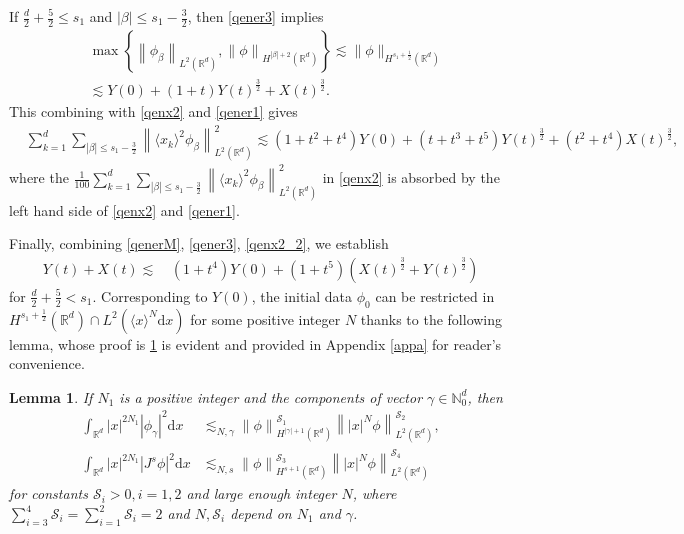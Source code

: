 \documentclass[10pt,twoside,a4paper]{article}
\newtheorem{lem}[thm]{Lemma}
\numberwithin{equation}{section}\allowdisplaybreaks
\def\leq{\leqslant}
\begin{document}
If $ \frac d2+\frac 52\leq s_1 $ and $ |\beta| \leq s_1-\frac32 $,  then  \eqref{qener3} implies
\begin{align}\label{qenbkk}
&	\max \left\{\left\|    \phi_{\beta}\right\|_{L^2(\mathbb{R}^d)}, \left\|   \phi\right\|_{H^{|\beta|+2}(\mathbb{R}^d)}\right\}  	\lesssim	 \|\phi\|_{H^{s_1+\frac 12}(\mathbb{R}^{d})}\nonumber\\
&\lesssim	Y(0)+	 (1+t) Y(t)^{\frac 32} +  X(t)^{\frac 32}.
\end{align}
This combining with \eqref{qenx2} and \eqref{qener1} gives
\begin{align} \label{qenx2_2}
&	\sum_{k=1}^d  \sum_{|\beta| \leq s_1-\frac32}\left\| \langle x_k\rangle^2 \phi_{\beta}\right\|_{L^2(\mathbb{R}^d)} ^2\lesssim  (1+t^2+t^4) Y(0) +(t+t^3+t^5)  Y(t)^{\frac 32} +(t^2+t^4)  X(t)^{\frac 32}, 
\end{align}
where the $  \frac {1}{100} \sum_{k=1}^d \sum_{|\beta| \leq s_1-\frac32}  \left\|  \langle x_k\rangle^2 \phi_{\beta}\right\|_{L^2(\mathbb{R}^d)}^{2}  $ in \eqref{qenx2} is absorbed by the left hand side of  \eqref{qenx2} and \eqref{qener1}.


Finally,  combining \eqref{qenerM}, \eqref{qener3},  \eqref{qenx2_2}, we establish
\begin{align} \label{qener}
		Y(t) +X(t)\lesssim &\, \left(1+ t^4\right)	Y(0)  +	\left(1+ t^5 \right)\left(X(t)^{\frac 32} +Y(t)^{\frac 32}\right)  
	\end{align} 
for $ \frac d2+\frac 52< s_1 .  $    
 Corresponding to $ Y(0) $,   the initial data $ \phi_0 $ can be  restricted in $ H^{s_1+\frac12} (\mathbb{R}^d) \cap  L^2(\langle x\rangle^N \mathrm{d}x)$ for some positive integer $ N $ thanks to the following lemma, whose proof is  \ref{lemx} is evident and provided in Appendix \ref{appa} for reader's convenience.
\begin{lem} \label{lemx} If $ N_1 $ is a  positive integer and the  components of vector $ \gamma \in \mathbb{N}^d_0 $, then
	\begin{align} 
		\int_{\mathbb{R}^d} |x|^{2N_1}|\phi_\gamma|^2 \mathrm{d} x&\lesssim_{N,\gamma} \left\|\phi\right\|_{H^{|\gamma|+1}(\mathbb{R}^d)}^{\mathscr{S}_1} \left\||x|^N \phi\right\|_{L^2(\mathbb{R}^d)}^{\mathscr{S}_2}, \label{lemx_1}  \\
		\int_{\mathbb{R}^d} |x|^{2N_1}|J^s\phi|^2 \mathrm{d} x&\lesssim_{N,s}\left\|\phi\right\|_{H^{s+1}(\mathbb{R}^d)}^{\mathscr{S}_3} \left\||x|^{N} \phi\right\|_{L^2(\mathbb{R}^d)}^{\mathscr{S}_4} \label{lemx_2}
	\end{align}
	for constants  $ \mathscr{S}_i>0, i=1,2  $ and  large enough integer $N$, where $ \sum_{i=3}^4\mathscr{S}_i=\sum_{i=1}^2\mathscr{S}_i=2 $ and  $N, \mathscr{S}_i  $   depend on $ N_1 $ and $ \gamma $. 
\end{lem}
\end{document}
